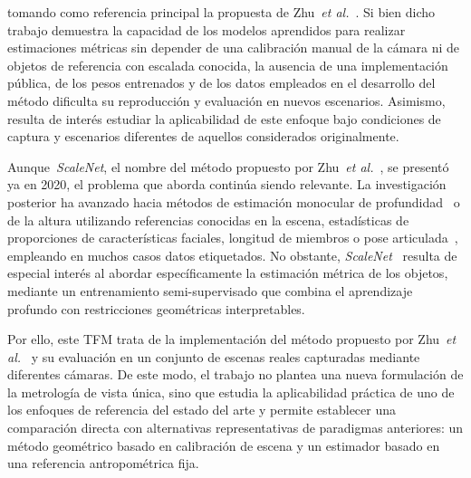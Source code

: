 tomando como referencia principal la propuesta de Zhu~\emph{et al.}~\cite{SVMIW}. Si bien dicho trabajo demuestra la capacidad de los modelos
aprendidos para realizar estimaciones métricas sin depender de una calibración manual de la cámara ni de objetos de referencia
con escalada conocida, la ausencia de una implementación pública, de los pesos entrenados y de los datos empleados en el desarrollo
del método dificulta su reproducción y evaluación en nuevos escenarios. Asimismo, resulta de interés estudiar la aplicabilidad de
este enfoque bajo condiciones de captura y escenarios diferentes de aquellos considerados originalmente.
\par
Aunque~\emph{ScaleNet}, el nombre del método propuesto por Zhu~\emph{et al.}~\cite{SVMIW}, se presentó ya en 2020, el problema que aborda continúa siendo relevante.
La investigación posterior ha avanzado hacia métodos de estimación monocular de profundidad~\cite{SurveyOnMonocularDepth} o
de la altura utilizando referencias conocidas en la escena, estadísticas de proporciones de características faciales, longitud de miembros o pose articulada~\cite{SAKINA2024765,RATTHI2024115133},
empleando en muchos casos datos etiquetados. No obstante, \emph{ScaleNet}~\cite{SVMIW} resulta de especial interés al abordar específicamente la estimación métrica de los objetos,
mediante un entrenamiento semi-supervisado que combina el aprendizaje profundo con restricciones geométricas interpretables.
\par
Por ello, este TFM trata de la implementación del método propuesto por Zhu~\emph{et al.}~\cite{SVMIW} y su
evaluación en un conjunto de escenas reales capturadas mediante diferentes cámaras.
De este modo, el trabajo no plantea una nueva formulación de la metrología de vista única, sino que estudia la aplicabilidad
práctica de uno de los enfoques de referencia del estado del arte y permite establecer una comparación directa con alternativas
representativas de paradigmas anteriores: un método geométrico basado en calibración de escena y un estimador basado en una referencia
antropométrica fija.

